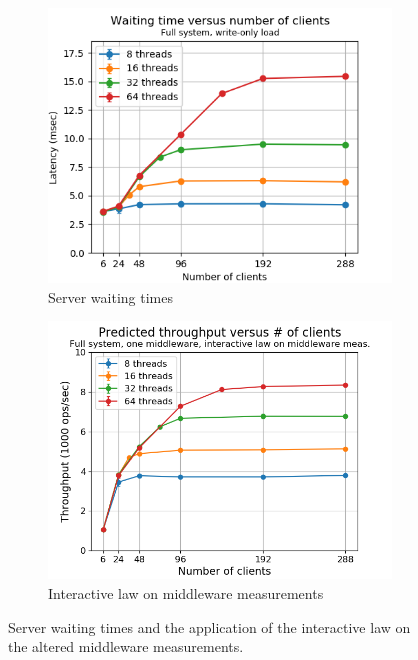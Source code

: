\documentclass[11pt,a4paper]{article}
\begin{document}
\begin{figure}[h!]
\centering
\begin{subfigure}{.5\textwidth}
  \centering
  \includegraphics[width=1.0\linewidth,trim={5px 0px 10px 0px},clip]{img/plot/tpfw-wtime_mw.png}
  \caption{Server waiting times}
  \label{fig:tpfw-wtime_mw}
\end{subfigure}%
\begin{subfigure}{.5\textwidth}
  \centering
  \includegraphics[width=1.0\linewidth,trim={5px 0px 10px 0px},clip]{img/plot/tpfw-tp_law_mw.png}
  \caption{Interactive law on middleware measurements}
  \label{fig:tpfw-tp_law_mw}
\end{subfigure}
\caption{Server waiting times and the application of the interactive law on the altered middleware measurements.}
\label{fig:tpfw-details}
\end{figure}
\end{document}
